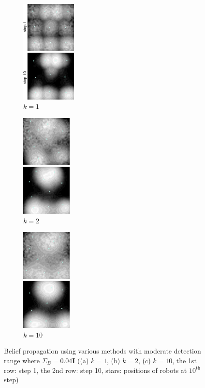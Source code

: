 \documentclass[journal]{IEEEtran}
\begin{document}
\begin{figure}
	\centering
	 \begin{subfigure}[b]{0.169\textwidth}
	 	\centering
		\includegraphics[width=1.093in]{figure/order1_step_0110_pdf}
		\caption{$k=1$}
	\end{subfigure}
	\begin{subfigure}[b]{0.15\textwidth}
		\centering
		\includegraphics[width=1in]{figure/order2_step_0110_pdf}
		\caption{$k=2$}
	\end{subfigure}
	 \begin{subfigure}[b]{0.15\textwidth}
	\centering
	\includegraphics[width=1in]{figure/ordern_step_0110_pdf}
	\caption{$k=10$}
\end{subfigure}
	\caption{Belief propagation using various methods with moderate detection range where $\Sigma_B = 0.04\mathbf{I}$ ((a) $k=1$, (b) $k=2$, (c) $k=10$, the 1st row: step 1, the 2nd row: step 10, stars: positions of robots at $10^{\text{th}}$ step)}
	\label{fig:fig3}
\end{figure}
\end{document}
